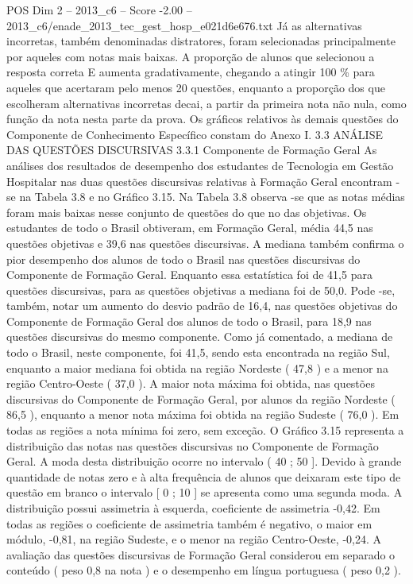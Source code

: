 \begin{textsample}{POS Dim 2 – 2013\_c6 – Score -2.00 – 2013\_c6/enade\_2013\_tec\_gest\_hosp\_e021d6e676.txt}
Já as alternativas incorretas, também denominadas distratores, foram selecionadas principalmente por aqueles com notas mais baixas.
A proporção de alunos que selecionou a resposta correta E aumenta gradativamente, chegando a atingir 100 \% para aqueles que acertaram pelo menos 20 questões, enquanto a proporção dos que escolheram alternativas incorretas decai, a partir da primeira nota não nula, como função da nota nesta parte da prova.
Os gráficos relativos às demais questões do Componente de Conhecimento Específico constam do Anexo I. 3.3 ANÁLISE DAS QUESTÕES DISCURSIVAS 3.3.1 Componente de Formação Geral As análises dos resultados de desempenho dos estudantes de Tecnologia em Gestão Hospitalar nas duas questões discursivas relativas à Formação Geral encontram -se na Tabela 3.8 e no Gráfico 3.15.
Na Tabela 3.8 observa -se que as notas médias foram mais baixas nesse conjunto de questões do que no das objetivas.
Os estudantes de todo o Brasil obtiveram, em Formação Geral, média 44,5 nas questões objetivas e 39,6 nas questões discursivas.
A mediana também confirma o pior desempenho dos alunos de todo o Brasil nas questões discursivas do Componente de Formação Geral.
Enquanto essa estatística foi de 41,5 para questões discursivas, para as questões objetivas a mediana foi de 50,0.
Pode -se, também, notar um aumento do desvio padrão de 16,4, nas questões objetivas do Componente de Formação Geral dos alunos de todo o Brasil, para 18,9 nas questões discursivas do mesmo componente.
Como já comentado, a mediana de todo o Brasil, neste componente, foi 41,5, sendo esta encontrada na região Sul, enquanto a maior mediana foi obtida na região Nordeste ( 47,8 ) e a menor na região Centro-Oeste ( 37,0 ).
A maior nota máxima foi obtida, nas questões discursivas do Componente de Formação Geral, por alunos da região Nordeste ( 86,5 ), enquanto a menor nota máxima foi obtida na região Sudeste ( 76,0 ).
Em todas as regiões a nota mínima foi zero, sem exceção.
O Gráfico 3.15 representa a distribuição das notas nas questões discursivas no Componente de Formação Geral.
A moda desta distribuição ocorre no intervalo ( 40 ; 50 ].
Devido à grande quantidade de notas zero e à alta frequência de alunos que deixaram este tipo de questão em branco o intervalo [ 0 ; 10 ] se apresenta como uma segunda moda.
A distribuição possui assimetria à esquerda, coeficiente de assimetria -0,42.
Em todas as regiões o coeficiente de assimetria também é negativo, o maior em módulo, -0,81, na região Sudeste, e o menor na região Centro-Oeste, -0,24.
A avaliação das questões discursivas de Formação Geral considerou em separado o conteúdo ( peso 0,8 na nota ) e o desempenho em língua portuguesa ( peso 0,2 ).

\end{textsample}
